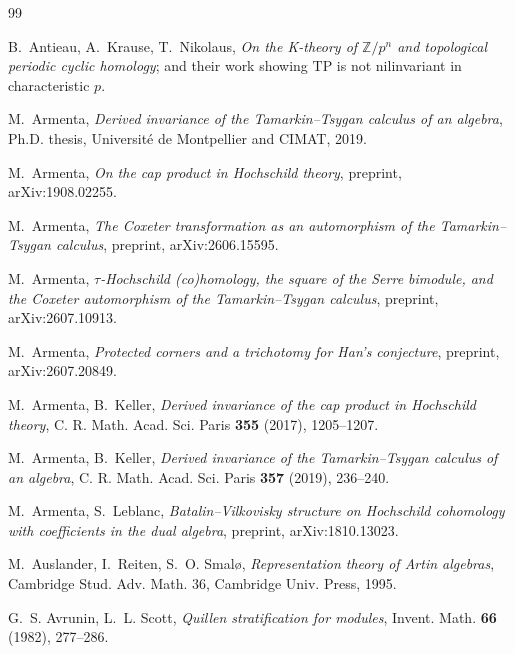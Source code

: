 \documentclass[11pt]{amsart}
\theoremstyle{definition}
\begin{document}
\begin{thebibliography}{99}

 B.~Antieau, A.~Krause, T.~Nikolaus, \emph{On the K-theory of
$\mathbb{Z}/p^n$ and topological periodic cyclic homology}; and their work
showing $\mathrm{TP}$ is not nilinvariant in characteristic $p$.

 M.~Armenta, \emph{Derived invariance of the
Tamarkin--Tsygan calculus of an algebra}, Ph.D. thesis, Universit\'e de
Montpellier and CIMAT, 2019.

 M.~Armenta, \emph{On the cap product in Hochschild theory},
preprint, arXiv:1908.02255.

 M.~Armenta, \emph{The Coxeter transformation as an
automorphism of the Tamarkin--Tsygan calculus}, preprint, arXiv:2606.15595.

 M.~Armenta, \emph{$\tau$-Hochschild (co)homology, the square
of the Serre bimodule, and the Coxeter automorphism of the Tamarkin--Tsygan
calculus}, preprint, arXiv:2607.10913.

 M.~Armenta, \emph{Protected corners and a trichotomy for
Han's conjecture}, preprint, arXiv:2607.20849.


 M.~Armenta, B.~Keller, \emph{Derived invariance of the cap
product in Hochschild theory}, C. R. Math. Acad. Sci. Paris \textbf{355}
(2017), 1205--1207.

 M.~Armenta, B.~Keller, \emph{Derived invariance of the
Tamarkin--Tsygan calculus of an algebra}, C. R. Math. Acad. Sci. Paris
\textbf{357} (2019), 236--240.

 M.~Armenta, S.~Leblanc, \emph{Batalin--Vilkovisky structure
on Hochschild cohomology with coefficients in the dual algebra}, preprint,
arXiv:1810.13023.

 M.~Auslander, I.~Reiten, S.~O. Smal\o, \emph{Representation
theory of Artin algebras}, Cambridge Stud. Adv. Math. 36, Cambridge Univ.
Press, 1995.

 G.~S. Avrunin, L.~L. Scott, \emph{Quillen
stratification for modules}, Invent. Math. \textbf{66} (1982), 277--286.


\end{thebibliography}
\end{document}
